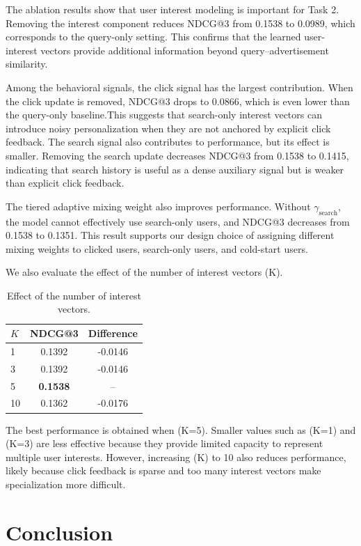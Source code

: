 \documentclass[sigconf, nonacm]{acmart}
\begin{document}
The ablation results show that user interest modeling is important for Task 2. Removing the interest component reduces NDCG@3 from 0.1538 to 0.0989, which corresponds to the query-only setting. This confirms that the learned user-interest vectors provide additional information beyond query--advertisement similarity.

Among the behavioral signals, the click signal has the largest contribution. When the click update is removed, NDCG@3 drops to 0.0866, which is even lower than the query-only baseline.This suggests that search-only interest vectors can introduce noisy personalization when they are not anchored by explicit click feedback. The search signal also contributes to performance, but its effect is smaller. Removing the search update decreases NDCG@3 from 0.1538 to 0.1415, indicating that search history is useful as a dense auxiliary signal but is weaker than explicit click feedback.

The tiered adaptive mixing weight also improves performance. Without $\gamma_{\text{search}}$, the model cannot effectively use search-only users, and NDCG@3 decreases from 0.1538 to 0.1351. This result supports our design choice of assigning different mixing weights to clicked users, search-only users, and cold-start users.

We also evaluate the effect of the number of interest vectors (K).

\begin{table}[h]
\centering
\caption{Effect of the number of interest vectors.}
\label{tab:kvec}
\begin{tabular}{lcc}
\hline
$K$ & NDCG@3 & Difference \\
\hline
1 & 0.1392 & -0.0146 \\
3 & 0.1392 & -0.0146 \\
5 & \textbf{0.1538} & -- \\
10 & 0.1362 & -0.0176 \\
\hline
\end{tabular}
\end{table}

The best performance is obtained when (K=5). Smaller values such as (K=1) and (K=3) are less effective because they provide limited capacity to represent multiple user interests. However, increasing (K) to 10 also reduces performance, likely because click feedback is sparse and too many interest vectors make specialization more difficult.




\section{Conclusion}
\label{sec:conclusions}
\end{document}
